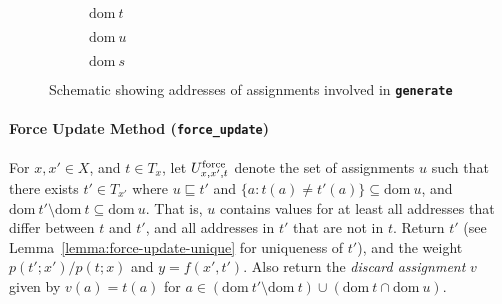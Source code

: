 \documentclass{article}
\newcommand{\code}[1]{\texttt{\small{\textbf{#1}}}}
\newcommand{\dom}[1]{\mbox{dom}{~#1}}
\newcommand{\force}[0]{\mbox{\scriptsize force}}
\newcommand{\contained}[0]{\sqsubseteq}
\begin{document}
\begin{figure}[t]
\centering
\begin{subfigure}[b]{0.3\textwidth}
\centering
{}
\caption{$\dom{t}$}
\end{subfigure}%
\begin{subfigure}[b]{0.3\textwidth}
\centering
{}
\caption{$\dom{u}$}
\end{subfigure}
\begin{subfigure}[b]{0.3\textwidth}
\centering
{}
\caption{$\dom{s}$}
\end{subfigure}
\caption{Schematic showing addresses of assignments involved in \code{generate}}
\end{figure}



\paragraph{Force Update Method (\code{force\_update})}
For $x, x' \in X$, and $t \in T_x$, let $U^{\force}_{x,x',t}$ denote the set of assignments $u$ such that there exists $t' \in T_{x'}$ where $u \contained t'$ and $\{ a: t(a) \ne t'(a)\} \subseteq \dom{u}$, and $\dom{t'} \setminus \dom{t} \subseteq \dom{u}$.
That is, $u$ contains values for at least all addresses that differ between $t$ and $t'$, and all addresses in $t'$ that are not in $t$.
Return $t'$ (see Lemma~\ref{lemma:force-update-unique} for uniqueness of $t'$), and the weight $p(t'; x') / p(t; x)$ and $y = f(x', t')$.
Also return the \emph{discard assignment} $v$ given by $v(a) = t(a)$ for $a \in (\dom{t'} \setminus \dom{t}) \cup (\dom{t} \cap \dom{u})$.
\end{document}
